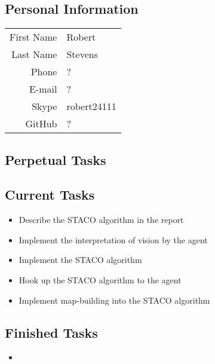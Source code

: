 \subsection{Personal Information}
\begin{table}[h!]
	\begin{tabular}{rl}
	First Name 	& Robert\\
	Last Name	& Stevens\\
	Phone		& ?\\
	E-mail		& ?\\
	Skype		& robert24111\\
	GitHub		& ?
\end{tabular}
\end{table}

\subsection{Perpetual Tasks}

\subsection{Current Tasks}
\begin{itemize}
	\item Describe the STACO algorithm in the report
	\item Implement the interpretation of vision by the agent
	\item Implement the STACO algorithm
	\item Hook up the STACO algorithm to the agent
	\item Implement map-building into the STACO algorithm
\end{itemize}

\subsection{Finished Tasks}
\begin{itemize}
	\item
\end{itemize}